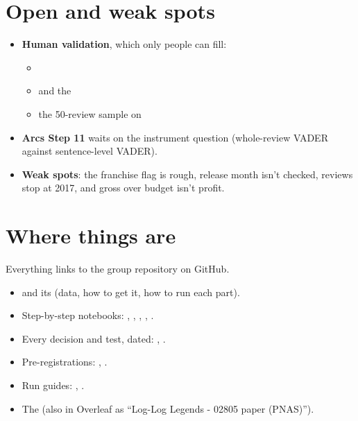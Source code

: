 \documentclass[10pt]{article}
\begin{document}
\section{Open and weak spots}
\begin{itemize}
  \item \textbf{Human validation}, which only people can fill:
  \begin{itemize}
    \item {}
    \item {} and the 
    \item the 50-review sample on 
  \end{itemize}
  \item \textbf{Arcs Step 11} waits on the instrument question (whole-review VADER against sentence-level VADER).
  \item \textbf{Weak spots}: the franchise flag is rough, release month isn't checked, reviews stop at 2017, and gross over budget isn't profit.
\end{itemize}

\section{Where things are}
Everything links to the group repository on GitHub.
\begin{itemize}
  \item {} and its  (data, how to get it, how to run each part).
  \item Step-by-step notebooks: , , , , .
  \item Every decision and test, dated: , .
  \item Pre-registrations: , .
  \item Run guides: , .
  \item The  (also in Overleaf as ``Log-Log Legends - 02805 paper (PNAS)'').
\end{itemize}
\end{document}
